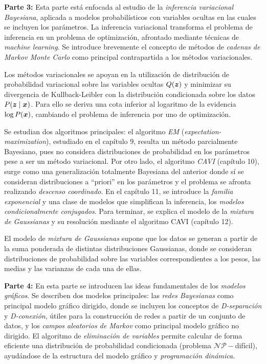 \textbf{Parte 3:} Esta parte está enfocada al estudio de la \emph{inferencia variacional Bayesiana}, aplicada a modelos probabilísticos con variables ocultas en las cuales se incluyen los parámetros. La inferencia variacional transforma el problema de inferencia en un problema de optimización, afrontado mediante técnicas de \emph{machine learning}. Se introduce brevemente el concepto de métodos de \emph{cadenas de Markov Monte Carlo} como principal contrapartida a los métodos variacionales.

Los métodos variacionales se apoyan en la utilización de distribución de probabilidad variacional sobre las variables ocultas \(Q(\bm{z})\) y minimizar su divergencia de Kullback-Leibler con la distribución condicionada sobre los datos \(P(\bm{z} \mid \bm{x})\). Para ello se deriva una cota inferior al logaritmo de la evidencia \(\log P(\bm{x})\), cambiando el problema de inferencia por uno de optimización.

Se estudian dos algoritmos principales: el algoritmo \emph{EM} (\emph{expectation-maximization}), estudiado en el capítulo 9, resulta un método parcialmente Bayesiano, pues no considera distribuciones de probabilidad en los parámetros pese a ser un método variacional. Por otro lado, el algoritmo \emph{CAVI} (capítulo 10), surge como una generalización totalmente Bayesiana del anterior donde sí se consideran distribuciones a ``priori'' en los parámetros y el problema se afronta realizando \emph{descenso coordinado}. En el capítulo 11, se introduce la \emph{familia exponencial} y una clase de modelos que simplifican la inferencia, los \emph{modelos condicionalmente conjugados}. Para terminar, se explica el modelo de la \emph{mixtura de Gaussianas} y su resolución mediante el algoritmo CAVI (capítulo 12).

El modelo de \emph{mixtura de Gaussianas} supone que los datos se generan a partir de la suma ponderada de distintas distribuciones Gaussianas, donde se consideran distribuciones de probabilidad sobre las variables correspondientes a los pesos, las medias y las varianzas de  cada una de ellas.

\textbf{Parte 4:} En esta parte se introducen las ideas fundamentales de los \emph{modelos gráficos}. Se describen dos modelos principales: las \emph{redes Bayesianas} como principal modelo gráfico dirigido, donde se incluyen los conceptos de \emph{D-separación} y \emph{D-conexión}, útiles para la construcción de redes a partir de un conjunto de datos, y los \emph{campos aleatorios de Markov} como principal modelo gráfico no dirigido. El algoritmo de \emph{eliminación de variables} permite calcular de forma eficiente una distribución de probabilidad condicionada (problema \(\mathcal{NP}-\)difícil), ayudándose de la estructura del modelo gráfico y \emph{programación dinámica}.

